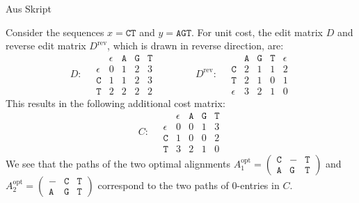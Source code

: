 
\begin{bsp}{Aus Skript}

    Consider the sequences $x = \mathtt{CT}$ and $y = \mathtt{AGT}$. For unit cost, the edit matrix $D$ and
    reverse edit matrix $D^{\mathrm{rev}}$, which is drawn in reverse direction, are:
    \[
        D:\quad
        \begin{array}{c|cccc}
            & \epsilon & \mathtt{A} & \mathtt{G} & \mathtt{T}\\\hline
            \epsilon & 0 & 1 & 2 & 3\\
            \mathtt{C} & 1 & 1 & 2 & 3\\
            \mathtt{T} & 2 & 2 & 2 & 2
        \end{array}
        \qquad\qquad
        D^{\mathrm{rev}}:\quad
        \begin{array}{c|cccc}
            & \mathtt{A} & \mathtt{G} & \mathtt{T} & \epsilon\\\hline
            \mathtt{C} & 2 & 1 & 1 & 2\\
            \mathtt{T} & 2 & 1 & 0 & 1\\
            \epsilon & 3 & 2 & 1 & 0
        \end{array}
    \]
    This results in the following additional cost matrix:
    \[
        C:\quad
        \begin{array}{c|cccc}
            & \epsilon & \mathtt{A} & \mathtt{G} & \mathtt{T}\\\hline
            \epsilon & 0 & 0 & 1 & 3\\
            \mathtt{C} & 1 & 0 & 0 & 2\\
            \mathtt{T} & 3 & 2 & 1 & 0
        \end{array}
    \]
    We see that the paths of the two optimal alignments
    $A^{\mathrm{opt}}_1 = \left(\begin{smallmatrix}\mathtt{C}&\mathtt{-}&\mathtt{T}\\
    \mathtt{A}&\mathtt{G}&\mathtt{T}\end{smallmatrix}\right)$ and
    $A^{\mathrm{opt}}_2 = \left(\begin{smallmatrix}\mathtt{-}&\mathtt{C}&\mathtt{T}\\
    \mathtt{A}&\mathtt{G}&\mathtt{T}\end{smallmatrix}\right)$ correspond to the two paths of $0$-entries in
    $C$.
\end{bsp}

